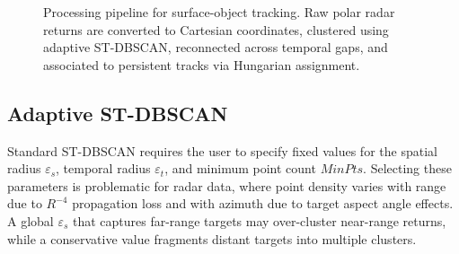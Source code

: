 \documentclass[conf]{new-aiaa}
\begin{document}
\begin{figure}[t]
\centering
{}
\caption{Processing pipeline for surface-object tracking. Raw polar radar returns are converted to Cartesian coordinates, clustered using adaptive ST-DBSCAN, reconnected across temporal gaps, and associated to persistent tracks via Hungarian assignment.}
\label{fig:pipeline}
\end{figure}

\subsection{Adaptive ST-DBSCAN}

Standard ST-DBSCAN requires the user to specify fixed values for the spatial radius $\varepsilon_s$, temporal radius $\varepsilon_t$, and minimum point count $\mathit{MinPts}$. Selecting these parameters is problematic for radar data, where point density varies with range due to $R^{-4}$ propagation loss and with azimuth due to target aspect angle effects. A global $\varepsilon_s$ that captures far-range targets may over-cluster near-range returns, while a conservative value fragments distant targets into multiple clusters.
\end{document}
